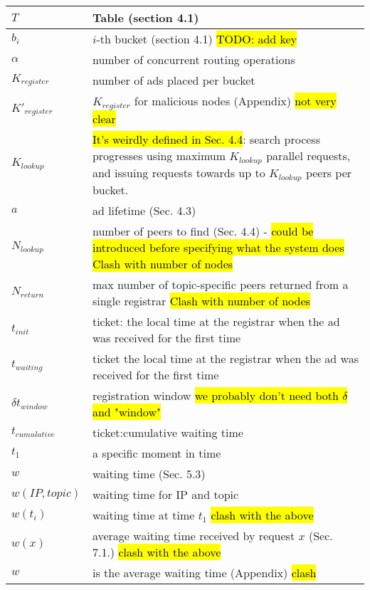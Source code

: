 \begin{table*}
\begin{center}
\begin{tabular}{ | l | p{16cm} |}
        $T$ & Table (section 4.1) \\ \hline
        $b_i$& $i$-th bucket (section 4.1) \hl{TODO: add key} \\ \hline
        $\alpha$ & number of concurrent routing operations \\ \hline
        $K_{\textit{register}}$ & number of ads placed per bucket\\ \hline
        $K'_{\textit{register}}$ & $K_{\textit{register}}$ for malicious nodes (Appendix) \hl {not very clear}\\ \hline
        $K_{\textit{lookup}}$ & \hl{It's weirdly defined in Sec. 4.4}: search process progresses using maximum $K_{\textit{lookup}}$  parallel requests, and issuing requests towards up to $K_{\textit{lookup}}$  peers per bucket.\\ \hline
        $a$ & ad lifetime  (Sec. 4.3)\\ \hline
        $N_{\textit{lookup}}$ & number of peers to find (Sec. 4.4) - \hl{could be introduced before specifying what the system does}  \hl{Clash with number of nodes} \\ \hline
        $N_{\textit{return}}$ & max number of topic-specific peers returned from a single registrar \hl{Clash with number of nodes} \\ \hline
        $t_{\textit{init}}$ & ticket: the local time at the registrar when the ad was received for the first time \\ \hline
        $t_{\textit{waiting}}$ & ticket the local time at the registrar when the ad was received for the first time \\ \hline
        $\delta t_{\textit{window}}$ & registration window \hl{we probably don't need both $\delta$ and "window"} \\ \hline
        $t_{\textit{cumulative}}$ & ticket:cumulative waiting time \\ \hline
        $t_1$ & a specific moment in time \\ \hline
        $w$ & waiting time (Sec. 5.3) \\ \hline
        $w(\textit{IP}, \textit{topic})$ & waiting time for IP and topic \\ \hline
        $w(t_i)$ & waiting time at time $t_1$ \hl{clash with the above} \\ \hline
        $w(x)$ & average waiting time received by request $x$ (Sec. 7.1.) \hl{clash with the above} \\ \hline
        $w$ & is the average waiting time (Appendix) \hl{clash} \\ \hline

\end{tabular}
\end{center}
\end{table*}
